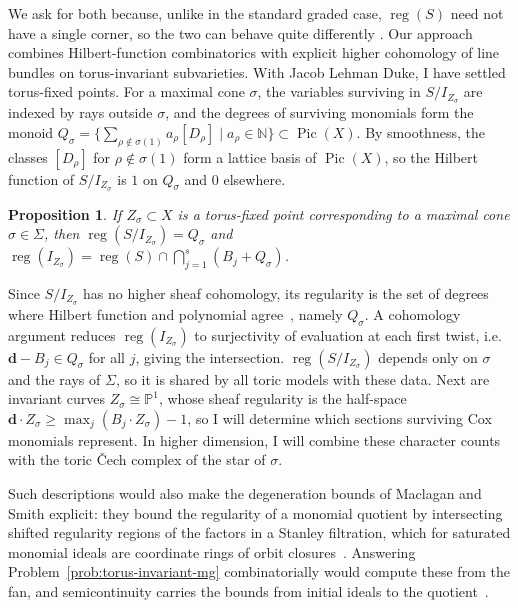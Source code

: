 \documentclass[11pt,reqno]{amsart}
\newtheorem{prop}[lemma]{Proposition}
\theoremstyle{remark}
\newcommand{\reg}{\operatorname{reg}}
\newcommand{\Pic}{\operatorname{Pic}}
\newcommand{\dd}{\mathbf{d}}
\newcommand{\NN}{\mathbb{N}}
\newcommand{\PP}{\mathbb{P}}
\begin{document}
We ask for both because, unlike in the standard graded case, $\reg(S)$ need not have a single corner, so the two can behave quite differently \cite{bruceHellerSayrafi22}. Our approach combines Hilbert-function combinatorics with explicit higher cohomology of line bundles on torus-invariant subvarieties. With Jacob Lehman Duke, I have settled torus-fixed points. For a maximal cone $\sigma$, the variables surviving in $S/I_{Z_\sigma}$ are indexed by rays outside $\sigma$, and the degrees of surviving monomials form the monoid $Q_\sigma=\{\sum_{\rho\notin\sigma(1)}a_\rho[D_\rho]\mid a_\rho\in\NN\}\subset\Pic(X)$. By smoothness, the classes $[D_\rho]$ for $\rho\notin\sigma(1)$ form a lattice basis of $\Pic(X)$, so the Hilbert function of $S/I_{Z_\sigma}$ is $1$ on $Q_\sigma$ and $0$ elsewhere.

\begin{prop}
If $Z_{\sigma} \subset X$ is a torus-fixed point corresponding to a maximal cone $\sigma \in \Sigma$, then $\reg(S/I_{Z_\sigma}) = Q_{\sigma}$ and $\reg(I_{Z_\sigma}) = \reg(S) \cap \bigcap_{j=1}^{s} (B_{j}+Q_{\sigma})$.
\end{prop}

Since $S/I_{Z_{\sigma}}$ has no higher sheaf cohomology, its regularity is the set of degrees where Hilbert function and polynomial agree~\cite[Prop.~6.4]{maclaganSmith04}, namely $Q_\sigma$. A cohomology argument reduces $\reg(I_{Z_\sigma})$ to surjectivity of evaluation at each first twist, i.e.\ $\dd-B_j\in Q_\sigma$ for all $j$, giving the intersection. $\reg(S/I_{Z_\sigma})$ depends only on $\sigma$ and the rays of $\Sigma$, so it is shared by all toric models with these data. Next are invariant curves $Z_\sigma\cong\PP^1$, whose sheaf regularity is the half-space $\dd\cdot Z_\sigma\ge\max_j(B_j\cdot Z_\sigma)-1$, so I will determine which sections surviving Cox monomials represent. In higher dimension, I will combine these character counts with the toric \v{C}ech complex of the star of $\sigma$.

Such descriptions would also make the degeneration bounds of Maclagan and Smith explicit: they bound the regularity of a monomial quotient by intersecting shifted regularity regions of the factors in a Stanley filtration, which for saturated monomial ideals are coordinate rings of orbit closures~\cite[Thm.~4.1]{maclaganSmith05}. Answering Problem~\ref{prob:torus-invariant-mg} combinatorially would compute these from the fan, and semicontinuity carries the bounds from initial ideals to the quotient~\cite[Prop.~6.13]{maclaganSmith04}.
\end{document}
